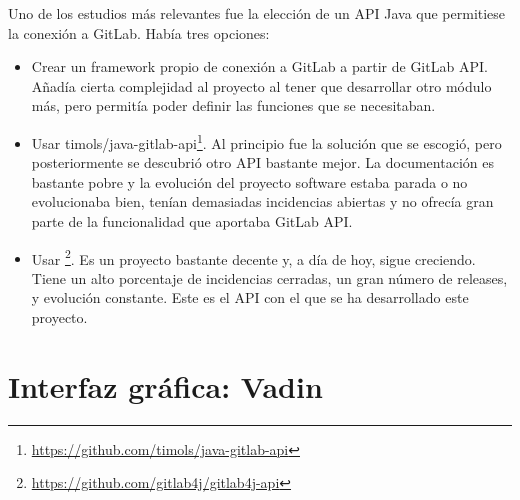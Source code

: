 Uno de los estudios más relevantes fue la elección de un API Java que permitiese la conexión a GitLab. Había tres opciones:
\begin{itemize}
	\item Crear un framework propio de conexión a GitLab a partir de GitLab API. Añadía cierta complejidad al proyecto al tener que desarrollar otro módulo más, pero permitía poder definir las funciones que se necesitaban.
	\item Usar timols/java-gitlab-api\footnote{\url{https://github.com/timols/java-gitlab-api}}\cite{olshansky_wrapper_2019}. Al principio fue la solución que se escogió, pero posteriormente se descubrió otro API bastante mejor. La documentación es bastante pobre y la evolución del proyecto software estaba parada o no evolucionaba bien, tenían demasiadas incidencias abiertas y no ofrecía gran parte de la funcionalidad que aportaba GitLab API.
	\item  Usar \footnote{\url{https://github.com/gitlab4j/gitlab4j-api}}\cite{noauthor_gitlab4j_2019}. Es un proyecto bastante decente y, a día de hoy, sigue creciendo. Tiene un alto porcentaje de incidencias cerradas, un gran número de releases, y evolución constante. Este es el API con el que se ha desarrollado este proyecto.
\end{itemize}

\section{Interfaz gráfica: Vadin}